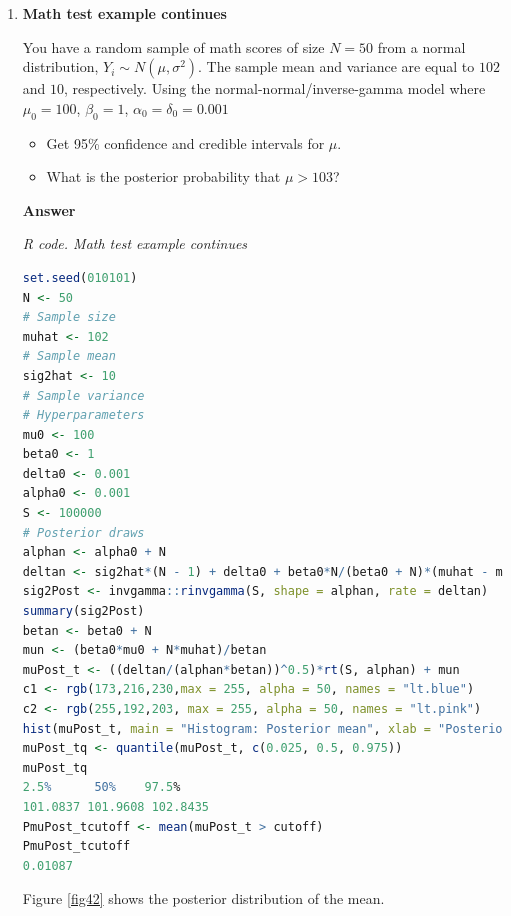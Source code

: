 \begin{enumerate}[leftmargin=*]
\item \textbf{Math test example continues}

You have a random sample of math scores of size $N=50$ from a normal distribution, $Y_i\sim N(\mu, \sigma^2)$. The sample mean and variance are equal to $102$ and $10$, respectively. Using the normal-normal/inverse-gamma model where $\mu_0=100$, $\beta_0=1$, $\alpha_0=\delta_0=0.001$

\begin{itemize}
	\item Get 95\% confidence and credible intervals for $\mu$.
	\item What is the posterior probability that $\mu > 103$?  
\end{itemize}  

{\textbf{Answer}}

\begin{tcolorbox}[enhanced,width=4.67in,center upper,
	fontupper=\large\bfseries,drop shadow southwest,sharp corners]
	\textit{R code. Math test example continues}
\begin{VF}
\begin{lstlisting}[language=R]
set.seed(010101)
N <- 50
# Sample size
muhat <- 102
# Sample mean
sig2hat <- 10
# Sample variance
# Hyperparameters
mu0 <- 100
beta0 <- 1
delta0 <- 0.001
alpha0 <- 0.001
S <- 100000
# Posterior draws
alphan <- alpha0 + N
deltan <- sig2hat*(N - 1) + delta0 + beta0*N/(beta0 + N)*(muhat - mu0)^2
sig2Post <- invgamma::rinvgamma(S, shape = alphan, rate = deltan)
summary(sig2Post)
betan <- beta0 + N
mun <- (beta0*mu0 + N*muhat)/betan
muPost_t <- ((deltan/(alphan*betan))^0.5)*rt(S, alphan) + mun
c1 <- rgb(173,216,230,max = 255, alpha = 50, names = "lt.blue")
c2 <- rgb(255,192,203, max = 255, alpha = 50, names = "lt.pink")
hist(muPost_t, main = "Histogram: Posterior mean", xlab = "Posterior mean", col = c1)
muPost_tq <- quantile(muPost_t, c(0.025, 0.5, 0.975))
muPost_tq
2.5%      50%    97.5% 
101.0837 101.9608 102.8435
PmuPost_tcutoff <- mean(muPost_t > cutoff)
PmuPost_tcutoff
0.01087
\end{lstlisting}
\end{VF}
\end{tcolorbox} 

Figure \ref{fig42} shows the posterior distribution of the mean.


\end{enumerate}
